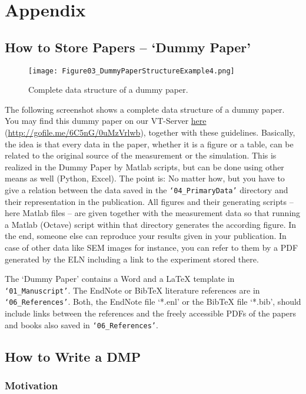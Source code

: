 \pagebreak
\section{Appendix}
\subsection{How to Store Papers – `Dummy Paper'}\label{app:dummy-paper}
\begin{wrapfigure}{r}{0.5\linewidth}
  \vspace{-1em}
  \texttt{[image: Figure03\_DummyPaperStructureExample4.png]}
  \caption{Complete data structure of a dummy paper.}
  \label{fig:dummy-paper}
\end{wrapfigure}
The following screenshot shows a complete data structure of a dummy paper.
You may find this dummy paper on our VT-Server
\href{http://gofile.me/6C5nG/0uMzVrlwb}{here}
(\url{http://gofile.me/6C5nG/0uMzVrlwb}),
together with these guidelines. Basically, the idea is that every data in the
paper, whether it is a figure or a table, can be related to the original source
of the measurement or the simulation. This is realized in the Dummy Paper by
Matlab scripts, but can be done using other means as well (Python, Excel). The
point is: No matter how, but you have to give a relation between the data saved
in the \texttt{‘04\_PrimaryData’} directory and their representation in the
publication. All figures and their generating scripts – here Matlab files – are
given together with the measurement data so that running a Matlab (Octave)
script within that directory generates the according figure. In the end, someone
else can reproduce your results given in your publication. In case of other data
like SEM images for instance, you can refer to them by a PDF generated by the
ELN including a link to the experiment stored there.

The `Dummy Paper' contains a Word and a LaTeX template in
\texttt{‘01\_Manuscript’}. The EndNote or BibTeX literature references are in
\texttt{‘06\_References’}. Both, the EndNote file ‘*.enl’ or the BibTeX file
‘*.bib’, should include links between the references and the freely accessible
PDFs of the papers and books also saved in \texttt{‘06\_References’}.

\subsection{How to Write a DMP}

\subsubsection{Motivation}

